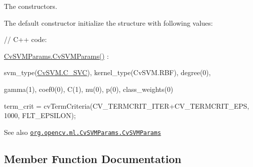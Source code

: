 The constructors.

The default constructor initialize the structure with following values\+:

{\ttfamily }

{\ttfamily }

{\ttfamily }

{\ttfamily // C++ code\+:}

{\ttfamily }

{\ttfamily }

{\ttfamily \mbox{\hyperlink{classorg_1_1opencv_1_1ml_1_1_cv_s_v_m_params_a49f85755379935bb245135021158de9a}{Cv\+S\+V\+M\+Params.\+Cv\+S\+V\+M\+Params()}} \+:}

{\ttfamily }

{\ttfamily }

{\ttfamily svm\+\_\+type(\mbox{\hyperlink{classorg_1_1opencv_1_1ml_1_1_cv_s_v_m_a8f904304af3689654b3d7de34ae54801}{Cv\+S\+V\+M.\+C\+\_\+\+S\+VC}}), kernel\+\_\+type(Cv\+S\+V\+M.\+R\+BF), degree(0),}

{\ttfamily }

{\ttfamily }

{\ttfamily gamma(1), coef0(0), C(1), nu(0), p(0), class\+\_\+weights(0)}

{\ttfamily }

{\ttfamily }

{\ttfamily term\+\_\+crit = cv\+Term\+Criteria(C\+V\+\_\+\+T\+E\+R\+M\+C\+R\+I\+T\+\_\+\+I\+T\+E\+R+\+C\+V\+\_\+\+T\+E\+R\+M\+C\+R\+I\+T\+\_\+\+E\+PS, 1000, F\+L\+T\+\_\+\+E\+P\+S\+I\+L\+ON);}

{\ttfamily }

{\ttfamily \begin{DoxySeeAlso}{See also}
\href{http://docs.opencv.org/modules/ml/doc/support_vector_machines.html#cvsvmparams-cvsvmparams}{\tt org.\+opencv.\+ml.\+Cv\+S\+V\+M\+Params.\+Cv\+S\+V\+M\+Params} 
\end{DoxySeeAlso}
}

\subsection{Member Function Documentation}
\mbox{\label{classorg_1_1opencv_1_1ml_1_1_cv_s_v_m_params_ad54df77ed42677c82b3940f65862f51b}} 
